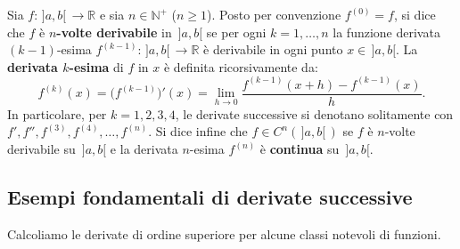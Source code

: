 \begin{defbox}
Sia $f \colon \,]a,b[\, \to \mathbb{R}$ e sia $n \in \mathbb{N}^+$ ($n \ge 1$). Posto per convenzione $f^{(0)} = f$, si dice che $f$ è \textbf{$n$-volte derivabile} in $\,]a,b[$ se per ogni $k = 1, \dots, n$ la funzione derivata $(k-1)$-esima $f^{(k-1)} \colon \,]a,b[\, \to \mathbb{R}$ è derivabile in ogni punto $x \in \,]a,b[$. La \textbf{derivata $k$-esima} di $f$ in $x$ è definita ricorsivamente da:
\[
    f^{(k)}(x) = \bigl(f^{(k-1)}\bigr)'(x) = \lim_{h \to 0} \frac{f^{(k-1)}(x+h) - f^{(k-1)}(x)}{h}.
\]
In particolare, per $k = 1, 2, 3, 4$, le derivate successive si denotano solitamente con $f', f'', f^{(3)}, f^{(4)}, \dots, f^{(n)}$. Si dice infine che $f \in C^n(\,]a,b[\,)$ se $f$ è $n$-volte derivabile su $\,]a,b[$ e la derivata $n$-esima $f^{(n)}$ è \textbf{continua} su $\,]a,b[$.
\end{defbox}

\subsection{Esempi fondamentali di derivate successive}

Calcoliamo le derivate di ordine superiore per alcune classi notevoli di funzioni.


